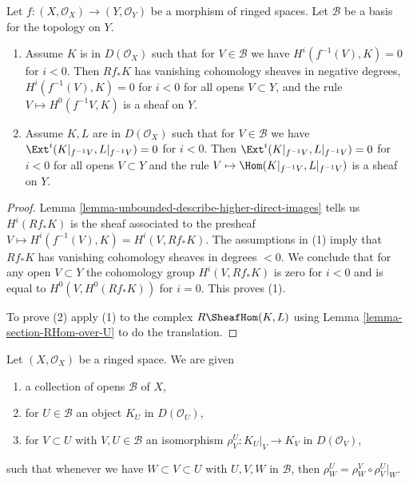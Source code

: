 \begin{lemma}
\label{lemma-vanishing-and-glueing}
Let $f : (X, \mathcal{O}_X) \to (Y, \mathcal{O}_Y)$ be a morphism
of ringed spaces. Let $\mathcal{B}$ be a basis for the topology on $Y$.
\begin{enumerate}
\item Assume $K$ is in $D(\mathcal{O}_X)$ such that
for $V \in \mathcal{B}$ we have $H^i(f^{-1}(V), K) = 0$ for $i < 0$.
Then $Rf_*K$ has vanishing cohomology sheaves in negative degrees,
$H^i(f^{-1}(V), K) = 0$ for $i < 0$ for all opens $V \subset Y$, and
the rule $V \mapsto H^0(f^{-1}V, K)$ is a sheaf on $Y$.
\item Assume $K, L$ are in $D(\mathcal{O}_X)$ such that
for $V \in \mathcal{B}$ we have
$\Ext^i(K|_{f^{-1}V}, L|_{f^{-1}V}) = 0$ for $i < 0$.
Then $\Ext^i(K|_{f^{-1}V}, L|_{f^{-1}V}) = 0$ for $i < 0$
for all opens $V \subset Y$ and
the rule $V \mapsto \Hom(K|_{f^{-1}V}, L|_{f^{-1}V})$ is a sheaf on $Y$.
\end{enumerate}
\end{lemma}

\begin{proof}
Lemma \ref{lemma-unbounded-describe-higher-direct-images} tells us
$H^i(Rf_*K)$ is the sheaf associated to the presheaf
$V \mapsto H^i(f^{-1}(V), K) = H^i(V, Rf_*K)$.
The assumptions in (1) imply that $Rf_*K$ has vanishing cohomology
sheaves in degrees $< 0$. We conclude that for any open $V \subset Y$
the cohomology group $H^i(V, Rf_*K)$ is zero for $i < 0$ and is equal to
$H^0(V, H^0(Rf_*K))$ for $i = 0$. This proves (1).

\medskip\noindent
To prove (2) apply (1) to the complex $R\SheafHom(K, L)$ using
Lemma \ref{lemma-section-RHom-over-U} to do the translation.
\end{proof}

\begin{situation}
\label{situation-locally-given}
Let $(X, \mathcal{O}_X)$ be a ringed space. We are given
\begin{enumerate}
\item a collection of opens $\mathcal{B}$ of $X$,
\item for $U \in \mathcal{B}$ an object $K_U$ in $D(\mathcal{O}_U)$,
\item for $V \subset U$ with $V, U \in \mathcal{B}$ an isomorphism
$\rho^U_V : K_U|_V \to K_V$ in $D(\mathcal{O}_V)$,
\end{enumerate}
such that whenever we have $W \subset V \subset U$ with $U, V, W$ in
$\mathcal{B}$, then $\rho^U_W = \rho^V_W \circ \rho ^U_V|_W$.
\end{situation}

